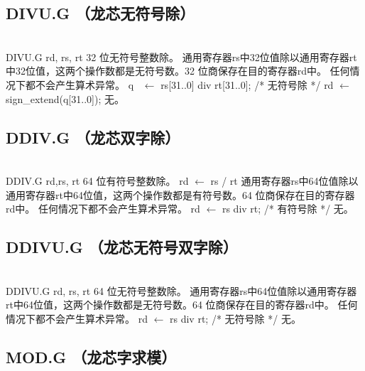 \subsection{DIVU.G （龙芯无符号除）}

\begin{instructionblk}
   \\
  \instructionbody
  {DIVU.G rd, rs, rt}
  {32 位无符号整数除。}
  {通用寄存器rs中32位值除以通用寄存器rt中32位值，这两个操作数都是无符号数。32
  位商保存在目的寄存器rd中。 \fldnewline
  任何情况下都不会产生算术异常。}
  {q~ $\leftarrow$ rs[31..0] div rt[31..0]; /* 无符号除 */\newline
  rd $\leftarrow$ sign\_extend(q[31..0]);}
  {无。}
\end{instructionblk}

\subsection{DDIV.G （龙芯双字除）}

\begin{instructionblk}
   \\
  \instructionbody
  {DDIV.G rd,rs, rt}
  {64 位有符号整数除。}
  {rd $\leftarrow$ rs / rt \fldnewline
  通用寄存器rs中64位值除以通用寄存器rt中64位值，这两个操作数都是有符号数。64
  位商保存在目的寄存器rd中。 \fldnewline
  任何情况下都不会产生算术异常。}
  {rd $\leftarrow$ rs div rt; /* 有符号除 */}
  {无。}
\end{instructionblk}

\subsection{DDIVU.G （龙芯无符号双字除）}

\begin{instructionblk}
   \\
  \instructionbody
  {DDIVU.G rd, rs, rt}
  {64 位无符号整数除。}
  {通用寄存器rs中64位值除以通用寄存器rt中64位值，这两个操作数都是无符号数。64
  位商保存在目的寄存器rd中。 \fldnewline
  任何情况下都不会产生算术异常。}
  {rd $\leftarrow$ rs div rt; /* 无符号除 */}
  {无。}
\end{instructionblk}

\subsection{MOD.G （龙芯字求模）}

